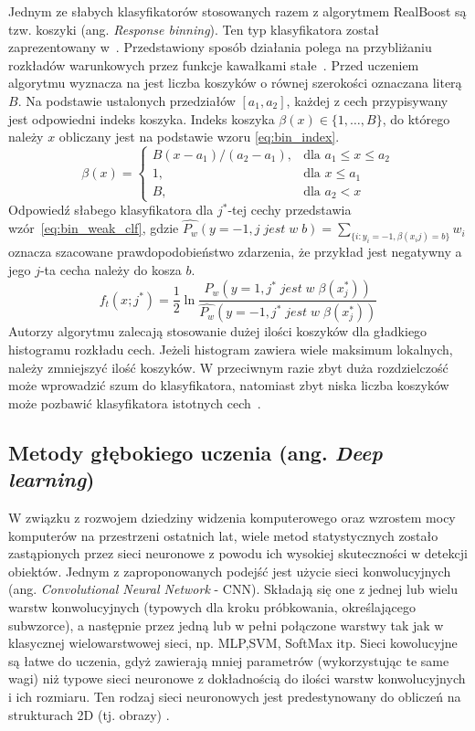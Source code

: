 Jednym ze słabych klasyfikatorów stosowanych razem z algorytmem RealBoost są tzw. koszyki (ang. \textit{Response binning}).
Ten typ klasyfikatora został zaprezentowany w~\cite{1689652}.
Przedstawiony sposób działania polega na przybliżaniu rozkładów warunkowych przez funkcje kawałkami stałe~\cite{szybka_detekcja_klesk}.
Przed uczeniem algorytmu wyznacza na jest liczba koszyków o równej szerokości oznaczana literą $B$.
Na podstawie ustalonych przedziałów $[a_1,a_2]$, każdej z cech przypisywany jest odpowiedni indeks koszyka.
Indeks koszyka $\beta(x) \in \{1,\dots,B\}$, do którego należy $x$ obliczany jest na podstawie wzoru \eqref{eq:bin_index}.
\begin{equation}
    \label{eq:bin_index}
    \beta(x)=\left.
    \begin{cases}
        B(x - a_1)/(a_2-a_1), & \text{dla } a_1 \leq x \leq a_2 \\
        1, & \text{dla } x \leq a_1 \\
        B, & \text{dla } a_2 < x
    \end{cases}
    \right.
\end{equation}
Odpowiedź słabego klasyfikatora dla $j^*$-tej cechy przedstawia wzór~\eqref{eq:bin_weak_clf}, gdzie $\hat{P_w}(y=-1, j\;jest\;w\;b)=\sum_{\{i:y_i=-1,\beta(x_ij)=b\}}^{} w_i$ oznacza szacowane prawdopodobieństwo zdarzenia, że przykład jest negatywny a jego $j$-ta cecha należy do kosza $b$.
\begin{equation}
    \label{eq:bin_weak_clf}
    f_t(x;j^*) = \dfrac{1}{2} \ln\dfrac{\hat{P_w}(y=1, j^*\;jest\;w\;\beta(x_j^*))}{\hat{P_w}(y=-1, j^*\;jest\;w\;\beta(x_j^*))}
\end{equation}
Autorzy algorytmu zalecają stosowanie dużej ilości koszyków dla gładkiego histogramu rozkładu cech.
Jeżeli histogram zawiera wiele maksimum lokalnych, należy zmniejszyć ilość koszyków.
W przeciwnym razie zbyt duża rozdzielczość może wprowadzić szum do klasyfikatora, natomiast zbyt niska liczba koszyków może pozbawić klasyfikatora istotnych cech~\cite{1689652}.

\subsection{Metody głębokiego uczenia (ang. \textit{Deep learning})}
W związku z rozwojem dziedziny widzenia komputerowego oraz wzrostem mocy komputerów na przestrzeni ostatnich lat, wiele metod statystycznych zostało zastąpionych przez sieci neuronowe z powodu ich wysokiej skuteczności w detekcji obiektów.
Jednym z zaproponowanych podejść jest użycie sieci konwolucyjnych (ang. \textit{Convolutional Neural Network} - CNN)\cite{cnn_detector}.
Składają się one z jednej lub wielu warstw konwolucyjnych (typowych dla kroku próbkowania, określającego subwzorce), a następnie przez jedną lub w pełni połączone warstwy tak jak w klasycznej wielowarstwowej sieci, np. MLP,SVM, SoftMax itp.
Sieci kowolucyjne są łatwe do uczenia, gdyż zawierają mniej parametrów (wykorzystując te same wagi) niż typowe sieci neuronowe z dokładnością do ilości warstw konwolucyjnych i ich rozmiaru.
Ten rodzaj sieci neuronowych jest predestynowany do obliczeń na strukturach 2D (tj. obrazy) \cite{cnn_agh}.

